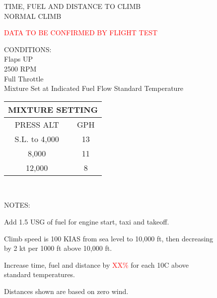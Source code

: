 \begin{figure}[t]
\begin{center}
\begin{perfhdr}TIME, FUEL AND DISTANCE TO CLIMB\\
NORMAL CLIMB\\
\end{perfhdr}
\Large
\textcolor{red}{DATA TO BE CONFIRMED BY FLIGHT TEST}\normalsize \\
\vspace{5ex}
\begin{minipage}{4in}
  \begin{flushleft}
    CONDITIONS:\\
    Flaps UP\\
    2500 RPM\\
    Full Throttle\\
    Mixture Set at Indicated Fuel Flow
    Standard Temperature\\
    \end{flushleft}
\end{minipage}
\hfill
\begin{minipage}{1.5in}
  \begin{tabular}{|c|c|}
    \hline
    \multicolumn{2}{|c|}{MIXTURE SETTING}\\
    \hline
    PRESS ALT&GPH\\
    \hline
    S.L. to 4,000&13\\
    8,000&11\\
    12,000&8\\
    \hline
    \end{tabular}
  \end{minipage}
\\
\vspace{\perfnoteskip}
    \raggedright NOTES:
    \begin{enumerate*}
      \item Add 1.5 USG of fuel for engine start, taxi and takeoff.
      \item Climb speed is 100 KIAS from sea level to 10,000 ft, then decreasing by 2 kt per 1000 ft above 10,000 ft.
      \item Increase time, fuel and distance by \textcolor{red}{XX\%} for each 10\textdegree C above standard temperatures.
      \item Distances shown are based on zero wind.
      \end{enumerate*}
\vspace{\perfnoteskip}
\settowidth{\colOne}{WEIGHT}
\settowidth{\colTwo}{PRESSURE}
\settowidth{\colThree}{TEMP}
\settowidth{\colFour}{CLIMB}
\settowidth{\colFive}{RATE OF}
\settowidth{\colSix}{TIME}
\settowidth{\colSeven}{USED}
\settowidth{\colEight}{DIST.}


\end{center}
\end{figure}

